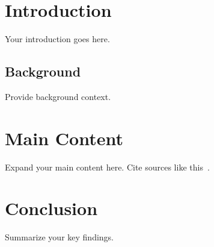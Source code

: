 \section{Introduction}
Your introduction goes here.

\subsection{Background}
Provide background context.

\section{Main Content}
Expand your main content here. Cite sources like this~\cite{example}.

\section{Conclusion}
Summarize your key findings.
